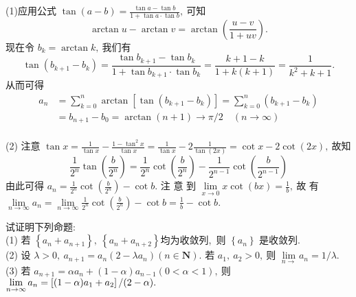 	\begin{solution}
		(1)应用公式  $\tan (a-b)=\frac{\tan a-\tan b}{1+\tan a \cdot \tan b} ,\  $可知
		$$\arctan u-\arctan v=\arctan \left(\frac{u-v}{1+u v}\right) .$$
		现在令 $ b_{k}=\arctan k ,\  $我们有
		$$\tan \left(b_{k+1}-b_{k}\right)=\frac{\tan b_{k+1}-\tan b_{k}}{1+\tan b_{k+1} \cdot \tan b_{k}}=\frac{k+1-k}{1+k(k+1)}=\frac{1}{k^{2}+k+1} .$$
		从而可得
		$$\begin{aligned}
			a_{n} &=\sum_{k=0}^{n} \arctan \left[\tan \left(b_{k+1}-b_{k}\right)\right]=\sum_{k=0}^{n}\left(b_{k+1}-b_{k}\right) \\
			&=b_{n+1}-b_{0}=\arctan (n+1) \rightarrow \pi / 2 \quad(n \rightarrow \infty)
		\end{aligned}$$\\
		(2) 注意  $\tan x=\frac{1}{\tan x}-\frac{1-\tan ^{2} x}{\tan x}=\frac{1}{\tan x}-2 \frac{1}{\tan (2 x)}=\cot x-2 \cot (2 x) ,\  $故知
		$$\frac{1}{2^n}\tan\left(\frac{b}{2^n}\right)=\frac{1}{2^n}\cot\left(\frac{b}{2^n}\right)-\frac{1}{2^{n-1}}\cot\left(\frac{b}{2^{n-1}}\right)$$
		由此可得  $a_{n}=\frac{1}{2^{n}} \cot \left(\frac{b}{2^{n}}\right)-\cot b .$ 注 意 到  $\lim\limits_{x \rightarrow 0} x \cot (b x)=\frac{1}{b} ,\  $故 有  $\lim\limits _{n \rightarrow \infty} a_{n}=   \lim\limits_{n \rightarrow \infty} \frac{1}{2^{n}} \cot \left(\frac{b}{2^{n}}\right)-\cot b=\frac{1}{b}-\cot b . $ 
	\end{solution}
	\newpage
	\begin{problem}
		试证明下列命题:\\
		(1) 若 $ \left\{a_{n}+a_{n+1}\right\},\ \left\{a_{n}+a_{n+2}\right\}  $均为收敛列,\  则  $\left\{a_{n}\right\}$  是收敛列.\\
		(2) 设  $\lambda>0,\  a_{n+1}=a_{n}\left(2-\lambda a_{n}\right)(n \in \mathbf{N}) .$ 若  $a_{1},\  a_{2}>0 ,\  $则 $ \lim\limits _{n \rightarrow} a_{n}=1 / \lambda .$\\
		(3) 若  $a_{n+1}=\alpha a_{n}+(1-\alpha) a_{n-1}(0<\alpha<1) ,\  $则  $\lim\limits\limits_{n \rightarrow \infty} a_{n}=\left[(1-\alpha) a_{1}+a_{2}\right] /(2-\alpha) .$
	\end{problem}
	
